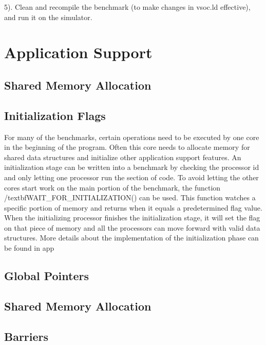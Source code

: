 \documentclass{article}
\begin{document}
\vspace{2mm}
5). Clean and recompile the benchmark (to make changes in vsoc.ld effective), and run it on the simulator.


\newpage


\section{Application Support}

\subsection{Shared Memory Allocation}



\subsection{Initialization Flags}

For many of the benchmarks, certain operations need to be executed by one core in the beginning
of the program.  Often this core needs to allocate memory for shared data structures and initialize 
other application support features.  An initialization stage can be written into a benchmark by checking
the processor id and only letting one processor run the section of code.  To avoid letting the other cores
start work on the main portion of the benchmark, the function /textbf{WAIT_FOR_INITIALIZATION()} can
be used.  This function watches a specific portion of memory and returns when it equals a predetermined 
flag value.  When the initializing processor finishes the initialization stage, it will set the flag on that piece of
memory and all the processors can move forward with valid data structures.  More details about the
implementation of the initialization phase can be found in app

\subsection{Global Pointers}
\subsection{Shared Memory Allocation}
\subsection{Barriers}
\end{document}
